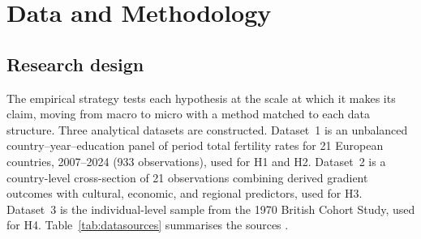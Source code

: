 \documentclass[12pt,a4paper]{report}
\begin{document}
\chapter{Data and Methodology}

\section{Research design}
The empirical strategy tests each hypothesis at the scale at which it makes its claim, moving from
macro to micro with a method matched to each data structure. Three analytical datasets are
constructed. Dataset~1 is an unbalanced country--year--education panel of period total fertility
rates for 21 European countries, 2007--2024 (933 observations), used for H1 and H2. Dataset~2 is a
country-level cross-section of 21 observations combining derived gradient outcomes with cultural,
economic, and regional predictors, used for H3. Dataset~3 is the individual-level sample from the
1970 British Cohort Study, used for H4. Table~\ref{tab:datasources} summarises the sources \citep{eurostat_faeduc,eurostat_edat,vdem2026,ess2024,oecd_gdp,oecd_lfp,worldbank_contra,bcs70_birth,bcs70_age42,bcs70_age51}.

\begin{table}[ht]
\centering
\caption{Data sources.}
\label{tab:datasources}
\footnotesize
{}
\end{table}
\end{document}
